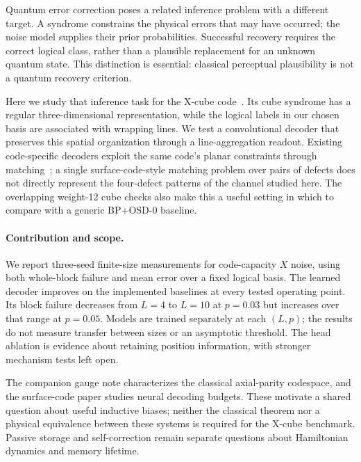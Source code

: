 \documentclass[11pt,a4paper]{article}
\begin{document}
Quantum error correction poses a related inference problem with a different
target. A syndrome constrains the physical errors that may have occurred;
the noise model supplies their prior probabilities. Successful recovery
requires the correct logical class, rather than a plausible replacement
for an unknown quantum state. This distinction is essential: classical
perceptual plausibility is not a quantum recovery criterion.

Here we study that inference task for the X-cube code~\cite{vijay2016}.
Its cube syndrome has a regular three-dimensional representation, while
the logical labels in our chosen basis are associated with wrapping lines.
We test a convolutional decoder that preserves this spatial organization
through a line-aggregation readout. Existing code-specific decoders exploit
the same code's planar constraints through matching~\cite{brown2019}; a
single surface-code-style matching problem over pairs of defects does not
directly represent the four-defect patterns of the channel studied here.
The overlapping weight-12 cube checks also make this a useful setting in
which to compare with a generic BP+OSD-0 baseline.

\paragraph{Contribution and scope.}
We report three-seed finite-size measurements for code-capacity $X$ noise,
using both whole-block failure and mean error over a fixed logical basis.
The learned decoder improves on the implemented baselines at every tested
operating point. Its block failure decreases from $L=4$ to $L=10$ at
$p=0.03$ but increases over that range at $p=0.05$. Models are trained
separately at each $(L,p)$; the results do not measure transfer between
sizes or an asymptotic threshold. The head ablation is evidence about
retaining position information, with stronger mechanism tests left open.

The companion gauge note characterizes the classical axial-parity
codespace, and the surface-code paper studies neural decoding budgets.
These motivate a shared question about useful inductive biases; neither
the classical theorem nor a physical equivalence between these systems
is required for the X-cube benchmark. Passive storage and self-correction
remain separate questions about Hamiltonian dynamics and memory lifetime.
\end{document}
